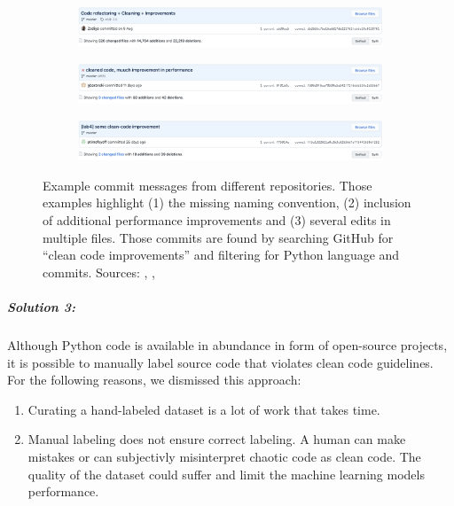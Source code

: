 \begin{figure}
    \begin{subfigure}{\textwidth}
        \includegraphics[width=1\linewidth]{img/ML/commit_messages/screen_1.png}
    \end{subfigure}
    \begin{subfigure}{\textwidth}
        \includegraphics[width=1\linewidth]{img/ML/commit_messages/screen_2.png}
    \end{subfigure}
    \begin{subfigure}{\textwidth}
        \includegraphics[width=1\linewidth]{img/ML/commit_messages/screen_3.png}
    \end{subfigure}
    \caption[short]%
    {Example commit messages from different repositories. Those examples highlight (1) the missing naming convention, (2) inclusion of additional performance improvements and (3) several edits in multiple files. Those commits are found by searching GitHub for \enquote{clean code improvements} and filtering for Python language and commits. Sources: \footnotemark[1], \footnotemark[2], \footnotemark[3]  }
    \label{fig:commit_messages}
\end{figure}
\subparagraph{Solution 3:}
Although Python code is available in abundance in form of open-source projects, it is possible to manually label source code that violates clean code guidelines. 
For the following reasons, we dismissed this approach:
\begin{enumerate}
    \item Curating a hand-labeled dataset is a lot of work that takes time. 
    \item Manual labeling does not ensure correct labeling. A human can make mistakes or can subjectivly misinterpret chaotic code as clean code. The quality of the dataset could suffer and limit the machine learning models performance.
\end{enumerate}
